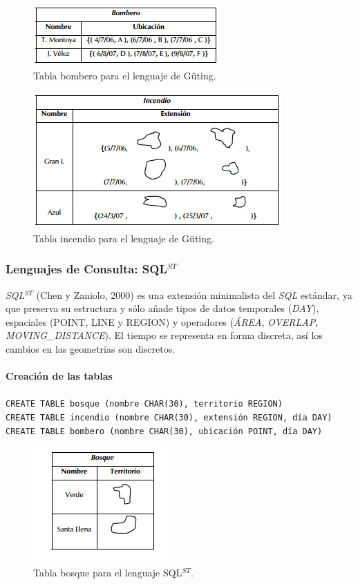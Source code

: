 \documentclass[a4paper,12pt,oneside]{report}
\begin{document}
\begin{figure}[h]
\centering
\includegraphics[scale=0.6]{images/tabomberoguting.png}
\caption{Tabla bombero para el lenguaje de G\"uting.}
\end{figure}

\begin{figure}[h]
\centering
\includegraphics[scale=0.6]{images/tabincendioguting.png}
\caption{Tabla incendio para el lenguaje de G\"uting.}
\end{figure}

\subsubsection*{Lenguajes de Consulta: SQL$^{ST}$}
\textit{SQL$^{ST}$} (Chen y Zaniolo, 2000) es una extensi\'on minimalista del \textit{SQL} est\'andar, ya que preserva su estructura y s\'olo a\~nade tipos de datos temporales (\textit{DAY}), espaciales (POINT, LINE y REGION) y operadores (\textit{\'AREA}, \textit{OVERLAP}, \textit{MOVING\_DISTANCE}). El tiempo se representa en forma discreta, as\'i los cambios en las geometr\'ias son discretos.\\
\ \\
\textbf{Creaci\'on de las tablas}\\
\ \\
\texttt{CREATE TABLE bosque (nombre CHAR(30), territorio REGION)\\
CREATE TABLE incendio (nombre CHAR(30), extensi\'on REGION, d\'ia DAY)\\
CREATE TABLE bombero (nombre CHAR(30), ubicaci\'on POINT, d\'ia DAY)
}
\begin{figure}[h]
\centering
\includegraphics[scale=0.6]{images/tabosque1.png}
\caption{Tabla bosque para el lenguaje SQL$^{ST}$.}
\end{figure}
\end{document}
